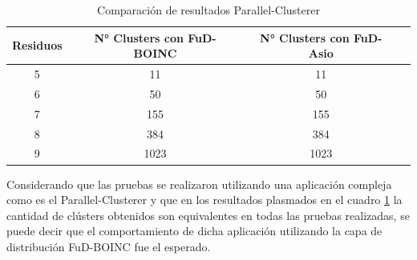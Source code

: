 \begin{table}[H]
\begin{center}
\begin{tabular}{| c| c| c| c|}
\hline
\textbf{Residuos} & \textbf{N° Clusters con FuD-BOINC} & \textbf{N° Clusters con FuD-Asio}\\ \hline 
5  & 11 & 11 \\ 
\hline
6  & 50 & 50 \\ 
\hline
7  & 155 & 155 \\ 
\hline
8  & 384 & 384 \\ 
\hline
9  & 1023 & 1023 \\ 
\hline
\end{tabular}
\caption{Comparación de resultados Parallel-Clusterer}
\label{Fb_vs_fa}
\end{center}
\end{table}

Considerando que las pruebas se realizaron utilizando una aplicación compleja como es el Parallel-Clusterer y que en los resultados plasmados en el cuadro \ref{Fb_vs_fa} la cantidad de clústers obtenidos son equivalentes en todas las pruebas realizadas, se puede decir que el comportamiento de dicha aplicación utilizando la capa de distribución FuD-BOINC fue el esperado.